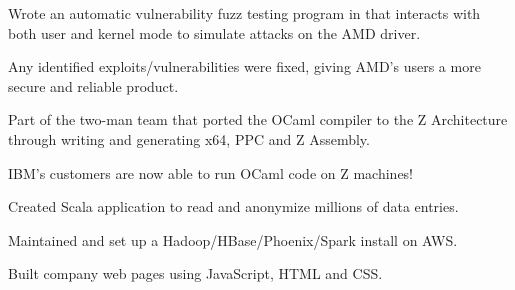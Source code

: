 \documentclass[letterpaper]{deedy-resume-modified} %
\begin{document}
\begin{minipage}[t]{0.70\textwidth}
\sectionspace %



\vspace{\topsep}
\begin{tightitemize}
\vspace{-10pt}
\item Wrote an automatic vulnerability fuzz testing program in \CPP \hspace{1pt} that interacts with both user and kernel mode to simulate attacks on the AMD driver.  
\item Any identified exploits/vulnerabilities were fixed, giving AMD's users a more secure and reliable product.
\end{tightitemize}

\sectionspace %



\begin{tightitemize}
\item Part of the two-man team that ported the OCaml compiler to the Z Architecture through writing and generating x64, PPC and Z Assembly.
\item IBM's customers are now able to run OCaml code on Z machines!
\end{tightitemize}

\sectionspace %



\begin{tightitemize}
\item Created Scala application to read and anonymize millions of data entries.
\item Maintained and set up a Hadoop/HBase/Phoenix/Spark install on AWS.
\item Built company web pages using JavaScript, HTML and CSS.
\end{tightitemize}

\sectionspace %


\end{minipage}
\end{document}
